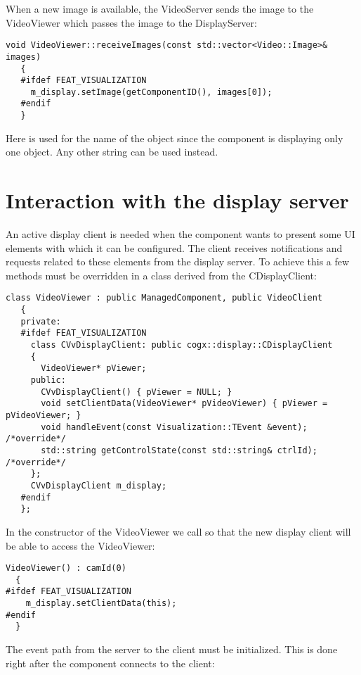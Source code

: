 When a new image is available, the VideoServer sends the image to the VideoViewer which
passes the image to the DisplayServer:

\begin{Verbatim}[fontsize=\scriptsize,gobble=3]
   void VideoViewer::receiveImages(const std::vector<Video::Image>& images)
   {
   #ifdef FEAT_VISUALIZATION
     m_display.setImage(getComponentID(), images[0]);
   #endif
   }
\end{Verbatim}

Here  is used for the name of the object since the component
is displaying only one object. Any other string can be used instead.


\section{Interaction with the display server}

An active display client is needed when the component wants to present some UI
elements with which it can be configured. The client receives notifications and
requests related to these elements from the display server. To achieve this 
a few methods must be overridden in a class derived from the CDisplayClient:

\begin{Verbatim}[fontsize=\scriptsize,gobble=3]
   class VideoViewer : public ManagedComponent, public VideoClient
   {
   private:
   #ifdef FEAT_VISUALIZATION
     class CVvDisplayClient: public cogx::display::CDisplayClient
     {
       VideoViewer* pViewer;
     public:
       CVvDisplayClient() { pViewer = NULL; }
       void setClientData(VideoViewer* pVideoViewer) { pViewer = pVideoViewer; }
       void handleEvent(const Visualization::TEvent &event); /*override*/
       std::string getControlState(const std::string& ctrlId); /*override*/
     };
     CVvDisplayClient m_display;
   #endif
   };
\end{Verbatim}

In the constructor of the VideoViewer we call  so that
the new display client will be able to access the VideoViewer:

\begin{Verbatim}[fontsize=\scriptsize,gobble=3]
  VideoViewer() : camId(0)
  {
#ifdef FEAT_VISUALIZATION
    m_display.setClientData(this);
#endif
  }
\end{Verbatim}

The event path from the server to the client must be initialized. This is done
right after the component connects to the client:

